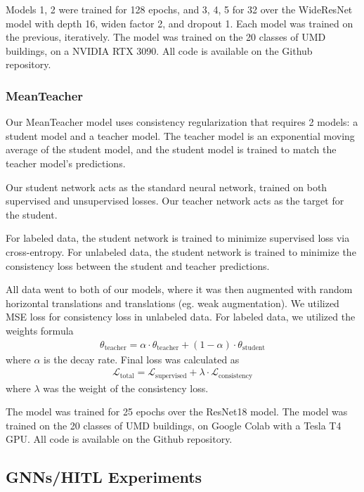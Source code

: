 \documentclass{article}
\begin{document}
Models 1, 2 were trained for 128 epochs, and 3, 4, 5 for 32 over the WideResNet model with depth 16, widen factor 2, and dropout 1. Each model was trained on the previous, iteratively. The model was trained on the 20 classes of UMD buildings, on a NVIDIA RTX 3090. All code is available on the Github repository.

\subsubsection{MeanTeacher}

Our MeanTeacher model uses consistency regularization that requires 2 models: a student model and a teacher model. The teacher model is an exponential moving average of the student model, and the student model is trained to match the teacher model’s predictions.

Our student network acts as the standard neural network, trained on both supervised and unsupervised losses. Our teacher network acts as the target for the student. 

For labeled data, the student network is trained to minimize supervised loss via cross-entropy. For unlabeled data, the student network is trained to minimize the consistency loss between the student and teacher predictions.

All data went to both of our models, where it was then augmented with random horizontal translations and translations (eg. weak augmentation). We utilized MSE loss for consistency loss in unlabeled data. For labeled data, we utilized the weights formula \begin{align*}
    \theta_{\text{teacher}}=\alpha \cdot\theta_{\text{teacher}}+(1-\alpha)\cdot\theta_{\text{student}}
\end{align*} where $\alpha$ is the decay rate. Final loss was calculated as \begin{align*}
    \mathcal{L}_{\text{total}}=\mathcal{L}_{\text{supervised}}+\lambda\cdot\mathcal{L}_{\text{consistency}}
\end{align*}where $\lambda$ was the weight of the consistency loss.

The model was trained for 25 epochs over the ResNet18 model. The model was trained on the 20 classes of UMD buildings, on Google Colab with a Tesla T4 GPU. All code is available on the Github repository.

\subsection{GNNs/HITL Experiments}
\end{document}
